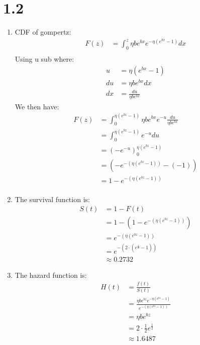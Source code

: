 \documentclass{article}
\begin{document}
\section*{1.2}
\begin{enumerate}
\item CDF of gompertz: \\
\begin{align*}
F(z) &= \int_0^z\eta b e^{bx}e^{-\eta(e^{bx} - 1)}dx \\
\end{align*}
Using u sub where: \\
\begin{align*}
u &= \eta(e^{bx} - 1) \\
du &= \eta b e^{bx}dx \\
dx &= \frac{du}{\eta b e^{bx}} 
\end{align*}
We then have: \\
\begin{align*}
F(z) &= \int_0^{\eta(e^{bz} - 1)}\eta b e^{bx}e^{-u}\frac{du}{\eta b e^{bx}} \\
&= \int_0^{\eta(e^{bz} - 1)}e^{-u}du \\
&= (-e^{-u})_0^{\eta(e^{bz} - 1)} \\
&= (-e^{-(\eta(e^{bz} - 1))} - (-1)) \\
&= 1 - e^{-(\eta(e^{bz} - 1))} \\
\end{align*}
\item The survival function is: \\
\begin{align*}
S(t) &= 1 - F(t) \\
&= 1 -  (1 - e^{-(\eta(e^{bz} - 1))}) \\
&= e^{-(\eta(e^{bz} - 1))} \\
&= e^{-(2 \cdot (e^{\frac{1}{2}} - 1))} \\
&\approx 0.2732
\end{align*}
\item The hazard function is: \\
\begin{align*}
H(t) &= \frac{f(t)}{S(t)} \\
&= \frac{\eta b e^{bz}e^{-\eta(e^{bz} - 1)}}{e^{-(\eta(e^{bz} - 1))}} \\
&= \eta b e^{bz} \\
&= 2 \cdot \frac{1}{2} e^{\frac{1}{2}} \\
&\approx 1.6487 \\
\end{align*}
\end{enumerate}
\end{document}
